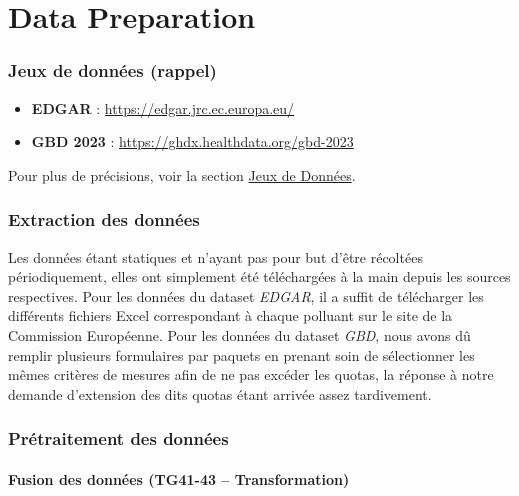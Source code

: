\documentclass[11pt,a4paper]{article}
\newcommand{\currentpart}{}
\let\oldpart\part
\renewcommand{\part}[1]{%
  \oldpart{#1}%
  \renewcommand{\currentpart}{\thepart.\ #1}%
  \markboth{\currentpart}{}%
}
\begin{document}
\clearpage
\part{Data Preparation}

\section{Jeux de données (rappel)}

\begin{itemize}[noitemsep]
    \item \textbf{EDGAR} : \url{https://edgar.jrc.ec.europa.eu/}
    \item \textbf{GBD 2023} : \url{https://ghdx.healthdata.org/gbd-2023}
\end{itemize}

Pour plus de précisions, voir la section \hyperref[sec:jeux-de-donnees]{Jeux de Données}.

\section{Extraction des données}

Les données étant statiques et n'ayant pas pour but d'être récoltées périodiquement, elles ont simplement été téléchargées à la main depuis les sources respectives. Pour les données du dataset \emph{EDGAR}, il a suffit de télécharger les différents fichiers Excel correspondant à chaque polluant sur le site de la Commission Européenne. Pour les données du dataset \emph{GBD}, nous avons dû remplir plusieurs formulaires par paquets en prenant soin de sélectionner les mêmes critères de mesures afin de ne pas excéder les quotas, la réponse à notre demande d'extension des dits quotas étant arrivée assez tardivement.

\clearpage
\section{Prétraitement des données}

\subsection{Fusion des données (TG41-43 -- Transformation)}
\end{document}
